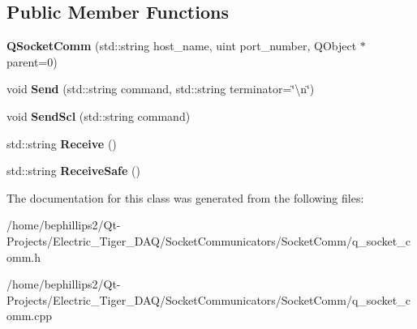 \subsection*{Public Member Functions}
\begin{DoxyCompactItemize}
\item 
{\bfseries Q\+Socket\+Comm} (std\+::string host\+\_\+name, uint port\+\_\+number, Q\+Object $\ast$parent=0)\hypertarget{class_q_socket_comm_afe66e31a1196650b60883380ae7dd141}{}\label{class_q_socket_comm_afe66e31a1196650b60883380ae7dd141}

\item 
void {\bfseries Send} (std\+::string command, std\+::string terminator=\char`\"{}\textbackslash{}n\char`\"{})\hypertarget{class_q_socket_comm_a6642ec94f586abdb30dfe0c0532b3bca}{}\label{class_q_socket_comm_a6642ec94f586abdb30dfe0c0532b3bca}

\item 
void {\bfseries Send\+Scl} (std\+::string command)\hypertarget{class_q_socket_comm_a900132260caef9b4e8b959350a5dfd06}{}\label{class_q_socket_comm_a900132260caef9b4e8b959350a5dfd06}

\item 
std\+::string {\bfseries Receive} ()\hypertarget{class_q_socket_comm_af3bd1b626085af405bd27dacf54950e1}{}\label{class_q_socket_comm_af3bd1b626085af405bd27dacf54950e1}

\item 
std\+::string {\bfseries Receive\+Safe} ()\hypertarget{class_q_socket_comm_a7e695332f9bca48a446bf446bd59acda}{}\label{class_q_socket_comm_a7e695332f9bca48a446bf446bd59acda}

\end{DoxyCompactItemize}


The documentation for this class was generated from the following files\+:\begin{DoxyCompactItemize}
\item 
/home/bephillips2/\+Qt-\/\+Projects/\+Electric\+\_\+\+Tiger\+\_\+\+D\+A\+Q/\+Socket\+Communicators/\+Socket\+Comm/q\+\_\+socket\+\_\+comm.\+h\item 
/home/bephillips2/\+Qt-\/\+Projects/\+Electric\+\_\+\+Tiger\+\_\+\+D\+A\+Q/\+Socket\+Communicators/\+Socket\+Comm/q\+\_\+socket\+\_\+comm.\+cpp\end{DoxyCompactItemize}
